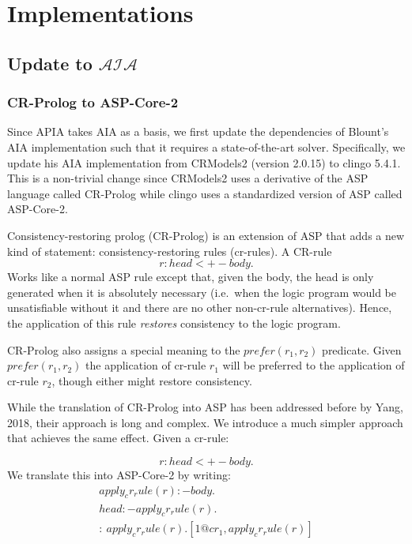 \chapter{Implementations}

%

\section{Update to $\mathcal{AIA}$}

\subsection{CR-Prolog to ASP-Core-2}

Since APIA takes AIA as a basis, we first update the dependencies of Blount's AIA implementation such that it requires a state-of-the-art solver.
Specifically, we update his AIA implementation from CRModels2 (version 2.0.15) to clingo 5.4.1.
This is a non-trivial change since CRModels2 uses a derivative of the ASP language called CR-Prolog while clingo uses a standardized version of ASP called ASP-Core-2.

Consistency-restoring prolog (CR-Prolog) is an extension of ASP that adds a new kind of statement: consistency-restoring rules (cr-rules).
A CR-rule
\begin{equation}
    r: head <+- body.
\end{equation}
Works like a normal ASP rule except that, given the body, the head is only generated when it is absolutely necessary (i.e.~when the logic program would be unsatisfiable without it and there are no other non-cr-rule alternatives).
Hence, the application of this rule \textit{restores} consistency to the logic program.

CR-Prolog also assigns a special meaning to the $prefer(r_1, r_2)$ predicate.
Given $prefer(r_1, r_2)$ the application of cr-rule $r_1$ will be preferred to the application of cr-rule $r_2$, though either might restore consistency.

While the translation of CR-Prolog into ASP has been addressed before by Yang, 2018, their approach is long and complex.
We introduce a much simpler approach that achieves the same effect.
Given a cr-rule:

\begin{equation}
    r: head <+- body.
\end{equation}
We translate this into ASP-Core-2 by writing:
\begin{gather}
    apply_cr_rule(r) :- body. \\
    head :- apply_cr_rule(r). \\
    :~ apply_cr_rule(r).
    [1@cr_1, apply_cr_rule(r)]
\end{gather}


